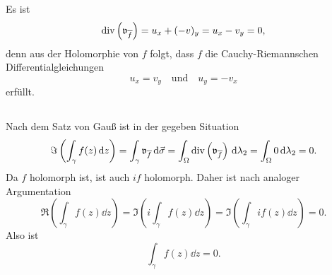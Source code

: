 \documentclass[a4paper,10pt]{article}
\begin{document}
\subsection{}
Es ist
\[
 \operatorname{div}\left( \mathfrak{v}_{\overline{f}} \right)
 = u_x + (-v)_y
 = u_x - v_y
 = 0,
\]
denn aus der Holomorphie von $f$ folgt, dass $f$ die Cauchy-Riemannschen Differentialgleichungen
\[
 u_x = v_y \quad \text{und} \quad u_y = -v_x
\]
erfüllt.


\subsection{}
Nach dem Satz von Gauß ist in der gegeben Situation
\[
 \Im\left( \int_\gamma f(z) \,\text{d}z \right)
 = \int_\gamma \mathfrak{v}_{\overline{f}} \,\text{d}\vec{\sigma}
 = \int_\Omega \operatorname{div}\left(\mathfrak{v}_{\overline{f}}\right) \,\text{d}\lambda_2
 = \int_\Omega 0 \,\text{d}\lambda_2
 = 0.
\]
Da $f$ holomorph ist, ist auch $if$ holomorph. Daher ist nach analoger Argumentation
\[
 \Re\left( \int_\gamma f(z) \dd{z} \right)
 = \Im\left( i \int_\gamma f(z) \dd{z} \right)
 = \Im\left( \int_\gamma if(z) \dd{z} \right)
 = 0.
\]
Also ist
\[
 \int_\gamma f(z) \dd{z} = 0.
\]
\end{document}
